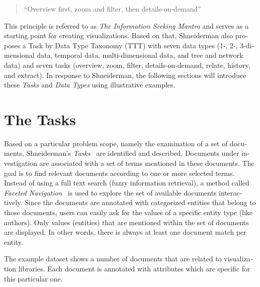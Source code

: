 \begin{english}
\begin{quotation}
    ``Overview first, zoom and filter, then details-on-demand''
\end{quotation}

\SuperPar This principle is referred to as \emph{The Information Seeking Mantra} and serves as a starting point for creating visualizations. Based on that, Shneiderman also proposes a Task by Data Type Taxonomy (TTT) with seven data types (1-, 2-, 3-dimensional data, temporal data, multi-dimensional data, and tree and network data) and seven tasks (overview, zoom, filter, details-on-demand, relate, history, and extract). In response to Shneiderman, the following sections will introduce these \emph{Tasks} and \emph{Data Types} using illustrative examples.

\section{The Tasks} %
\label{sec:tasks}


Based on a particular problem scope, namely the examination of a set of documents, Shneiderman's \emph{Tasks}~\cite{shneiderman96eyes} are identified and described. Documents under investigation are associated with a set of terms mentioned in these documents. The goal is to find relevant documents according to one or more selected terms. Instead of using a full text search (fuzzy information retrieval), a method called \emph{Faceted Navigation}~\cite{Huynh09} is used to explore the set of available documents interactively. Since the documents are annotated with categorized entities that belong to those documents, users can easily ask for the values of a specific entity type (like authors). Only values (entities) that are mentioned within the set of documents are displayed. In other words, there is always at least one document match per entity.



The example dataset shows a number of documents that are related to visualization libraries. Each document is annotated with attributes which are specific for this particular one.


\end{english}
